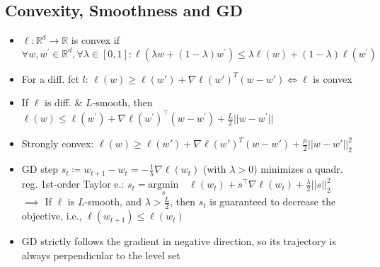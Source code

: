 \subsection{Convexity, Smoothness and GD}
\begin{itemize}
    \item $\ell: \mathbb{R}^d \to \mathbb{R}$ is convex if $\forall w, w^\prime \in \mathbb{R}^d, \forall \lambda \in[0,1]: \ell(\lambda w + (1-\lambda) w^\prime) \leq \lambda \ell(w) + (1-\lambda) \ell(w^\prime)$
    \item For a diff. fct $l$: $\ell(w) \geq \ell(w') + \nabla \ell(w')^T (w-w')\Leftrightarrow \ell$ is convex
    \item If $\ell$ is diff. \& $L$-smooth, then $\ell(w) \leq \ell(w^\prime)+\nabla \ell(w^\prime)^\intercal(w-w^\prime)+\frac{L}{2}||w-w^\prime||$
    \item Strongly convex: $\ell(w) \geq \ell(w') + \nabla \ell(w')^T (w-w') + \frac{\mu}{2}||w-w'||_2^2$
    \item GD step $s_t \coloneqq w_{t+1}-w_t = -\frac{1}{\lambda}\nabla \ell (w_t)$ (with $\lambda >0$) minimizes a quadr. reg. 1st-order Taylor e.: $s_t =\underset{s}{\text{argmin}} \quad \ell (w_t) +s^\intercal \nabla \ell(w_t)+\frac{\lambda}{2}||s||^2_2 $ \\
    $\implies$ If $\ell$ is $L$-smooth, and $\lambda >\frac{L}{2}$, then $s_t$ is guaranteed to decrease the objective, i.e., $\ell(w_{t+1})\leq\ell(w_t)$        \item GD strictly follows the gradient in negative direction, so its trajectory is always perpendicular to the level set
\end{itemize}